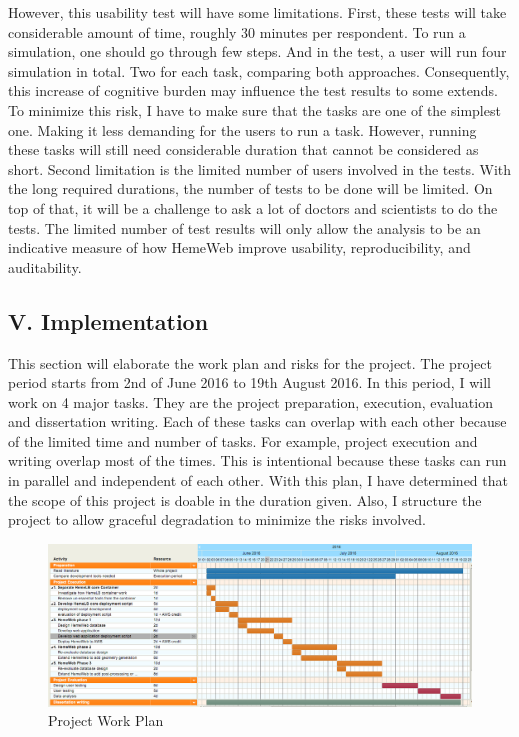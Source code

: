 \documentclass[]{article}
\begin{document}
However, this usability test will have some limitations. First, these
tests will take considerable amount of time, roughly 30 minutes per
respondent. To run a simulation, one should go through few steps. And in
the test, a user will run four simulation in total. Two for each task,
comparing both approaches. Consequently, this increase of cognitive
burden may influence the test results to some extends. To minimize this
risk, I have to make sure that the tasks are one of the simplest one.
Making it less demanding for the users to run a task. However, running
these tasks will still need considerable duration that cannot be
considered as short. Second limitation is the limited number of users
involved in the tests. With the long required durations, the number of
tests to be done will be limited. On top of that, it will be a challenge
to ask a lot of doctors and scientists to do the tests. The limited
number of test results will only allow the analysis to be an indicative
measure of how HemeWeb improve usability, reproducibility, and
auditability.

\subsection{V. Implementation}\label{v.-implementation}

This section will elaborate the work plan and risks for the project. The
project period starts from 2nd of June 2016 to 19th August 2016. In this
period, I will work on 4 major tasks. They are the project preparation,
execution, evaluation and dissertation writing. Each of these tasks can
overlap with each other because of the limited time and number of tasks.
For example, project execution and writing overlap most of the times.
This is intentional because these tasks can run in parallel and
independent of each other. With this plan, I have determined that the
scope of this project is doable in the duration given. Also, I structure
the project to allow graceful degradation to minimize the risks
involved.

\begin{figure}[H]
\centering
\includegraphics{../resources/images/workplan.png}
\caption{Project Work Plan}
\end{figure}
\end{document}
